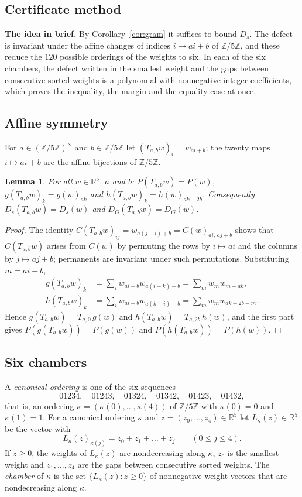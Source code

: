\documentclass[11pt,a4paper]{article}
\newtheorem{lemma}[theorem]{Lemma}
\theoremstyle{definition}
\theoremstyle{remark}
\newcommand{\R}{\mathbb{R}}
\newcommand{\Z}{\mathbb{Z}}
\newcommand{\para}[1]{\par\medskip\noindent\textbf{#1}\enspace}
\begin{document}
\subsection{Certificate method}\label{sec:proofs}

\para{The idea in brief.} By Corollary~\ref{cor:gram} it suffices to bound $D_s$. The defect is invariant under the
affine changes of indices $i\mapsto ai+b$ of $\Z/5\Z$, and these reduce the $120$ possible orderings of the weights to
six. In each of the six chambers, the defect written in the smallest weight and the gaps between consecutive sorted
weights is a polynomial with nonnegative integer coefficients, which proves the inequality, the margin and the equality
case at once.

\subsection{Affine symmetry}
For $a\in(\Z/5\Z)^\times$ and $b\in\Z/5\Z$ let $(T_{a,b}w)_i=w_{ai+b}$; the twenty maps $i\mapsto ai+b$ are the affine
bijections of $\Z/5\Z$.

\begin{lemma}\label{lem:affine}
For all $w\in\R^5$, $a$ and $b$: $P(T_{a,b}w)=P(w)$, $g(T_{a,b}w)_k=g(w)_{ak}$ and $h(T_{a,b}w)_k=h(w)_{ak+2b}$.
Consequently $D_s(T_{a,b}w)=D_s(w)$ and $D_G(T_{a,b}w)=D_G(w)$.
\end{lemma}

\begin{proof}
The identity $C(T_{a,b}w)_{ij}=w_{a(j-i)+b}=C(w)_{ai,\,aj+b}$ shows that $C(T_{a,b}w)$ arises from $C(w)$ by permuting the rows by
$i\mapsto ai$ and the columns by $j\mapsto aj+b$; permanents are invariant under such permutations. Substituting
$m=ai+b$,
\begin{align*}
g(T_{a,b}w)_k&=\sum_iw_{ai+b}w_{a(i+k)+b}=\sum_mw_mw_{m+ak},\\
h(T_{a,b}w)_k&=\sum_iw_{ai+b}w_{a(k-i)+b}=\sum_mw_mw_{ak+2b-m}.
\end{align*}
Hence $g(T_{a,b}w)=T_{a,0}\,g(w)$ and $h(T_{a,b}w)=T_{a,2b}\,h(w)$, and the first part gives
$P(g(T_{a,b}w))=P(g(w))$ and $P(h(T_{a,b}w))=P(h(w))$.
\end{proof}

\subsection{Six chambers}
A \emph{canonical ordering} is one of the six sequences
\begin{equation}\label{eq:orders}
01234,\quad01243,\quad01324,\quad01342,\quad01423,\quad01432,
\end{equation}
that is, an ordering $\kappa=(\kappa(0),\dots,\kappa(4))$ of $\Z/5\Z$ with $\kappa(0)=0$ and $\kappa(1)=1$. For a
canonical ordering $\kappa$ and $z=(z_0,\dots,z_4)\in\R^5$ let $L_\kappa(z)\in\R^5$ be the vector with
\[
L_\kappa(z)_{\kappa(j)}=z_0+z_1+\dots+z_j\qquad(0\le j\le4).
\]
If $z\ge0$, the weights of $L_\kappa(z)$ are nondecreasing along $\kappa$, $z_0$ is the smallest weight and
$z_1,\dots,z_4$ are the gaps between consecutive sorted weights. The \emph{chamber} of $\kappa$ is the set
$\{L_\kappa(z):z\ge0\}$ of nonnegative weight vectors that are nondecreasing along $\kappa$.
\end{document}
